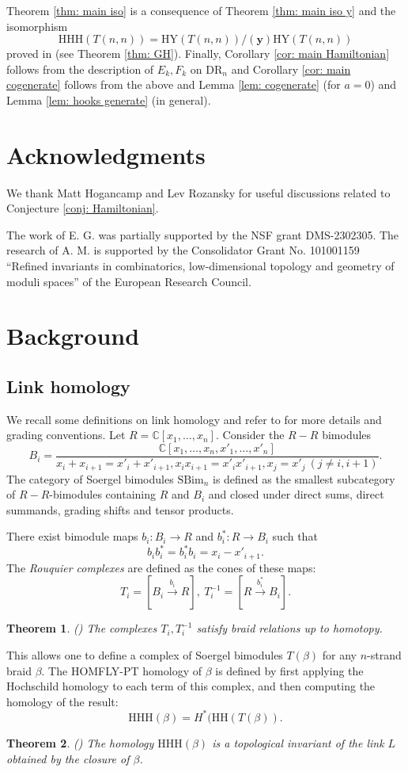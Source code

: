 \documentclass{amsart}
\newcommand{\C}{\mathbb{C}}
\newcommand{\yy}{\mathbf{y}}
\newcommand{\DR}{\mathrm{DR}}
\newcommand{\HY}{\mathrm{HY}}
\newcommand{\HH}{\mathrm{HH}}
\newcommand{\HHH}{\mathrm{HHH}}
\newcommand{\SBim}{\mathrm{SBim}}
\numberwithin{equation}{section}
\newtheorem{theorem}{Theorem}[section]
\theoremstyle{definition}
\begin{document}
Theorem \ref{thm: main iso} is a consequence of Theorem \ref{thm: main iso y} and the isomorphism 
$$
\HHH(T(n,n))=\HY(T(n,n))/(\yy)\HY(T(n,n))
$$
proved in \cite{GH} (see Theorem \ref{thm: GH}).  Finally, Corollary \ref{cor: main Hamiltonian} follows from the description of $E_k,F_k$ on $\DR_n$ and 
Corollary \ref{cor: main cogenerate} follows from the above and Lemma \ref{lem: cogenerate} (for $a=0$) and Lemma \ref{lem: hooks generate} (in general).


\section*{Acknowledgments}

We thank Matt Hogancamp and Lev Rozansky for useful discussions related to Conjecture \ref{conj: Hamiltonian}.

The work of E. G. was partially supported by the NSF grant DMS-2302305. The research of A. M. is supported by the Consolidator Grant No. 101001159 ``Refined invariants in combinatorics, low-dimensional topology and geometry of moduli spaces” of the
European Research Council.

\section{Background}
\label{sec: background}

\subsection{Link homology}

We recall some definitions on link homology and refer to \cite{GH,GHM} for more details and grading conventions. Let $R=\C[x_1,\ldots,x_n]$. Consider the $R-R$ bimodules
$$
B_i=\frac{\C[x_1,\ldots,x_n,x'_1,\ldots,x'_n]}{x_i+x_{i+1}=x'_i+x'_{i+1},x_ix_{i+1}=x'_ix'_{i+1},x_j=x'_j\ (j\neq i,i+1)}.
$$
The category of Soergel bimodules $\SBim_n$ is defined as the smallest subcategory of $R-R$-bimodules containing $R$ and $B_i$ and closed under direct sums, direct summands, grading shifts and tensor products. 

There exist bimodule maps $b_i:B_i\to R$ and $b_i^*:R\to B_i$ such that 
$$
b_ib^*_i=b^*_ib_{i}=x_i-x'_{i+1}.
$$
The {\em Rouquier complexes} are defined as the cones of these maps:
$$
T_i=\left[B_i\xrightarrow{b_i} R\right],\ T_i^{-1}=\left[R\xrightarrow{b_i^*} B_i\right].
$$
\begin{theorem}(\cite{Rouquier})
The complexes $T_i,T_i^{-1}$ satisfy braid relations up to homotopy. 
\end{theorem}
This allows one to define a complex of Soergel bimodules $T(\beta)$ for any $n$-strand braid $\beta$. The HOMFLY-PT homology of $\beta$ is defined by first applying the Hochschild homology to each term of this complex, and then computing the homology of the result:
$$
\HHH(\beta)=H^*(\HH(T(\beta)).
$$
\begin{theorem}(\cite{KhSoergel,KR2})
The homology $\HHH(\beta)$ is a topological invariant of the link $L$ obtained by the closure of $\beta$.
\end{theorem}
\end{document}
